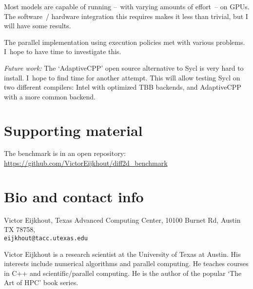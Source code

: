 \documentclass[11pt,fleqn]{artikel3}
\begin{document}
Most models are capable of running --~with varying amounts of effort~-- on GPUs.
The software~/ hardware integration this requires makes it less than trivial,
but I will have some results.

The parallel implementation using execution policies
met with various problems.
I~hope to have time to investigate this.

\textsl{Future work:}
%
The `AdaptiveCPP' open source alternative to Sycl is very hard to install.
I~hope to find time for another attempt. This will allow testing Sycl
on two different compilers: Intel with optimized TBB backends,
and AdaptiveCPP with a more common backend.

\section*{Supporting material}

The benchmark is in an open repository:
\url{https://github.com/VictorEijkhout/diff2d_benchmark}

\section*{Bio and contact info}

Victor Eijkhout, Texas Advanced Computing Center, 10100 Burnet Rd, Austin TX 78758,\\
\texttt{eijkhout@tacc.utexas.edu}

Victor Eijkhout is a research scientist at the University of Texas at Austin.
His interests include numerical algorithms and parallel computing.
He teaches courses in C++ and scientific/parallel computing.
He is the author of the popular `The Art of HPC' book series.
\end{document}
